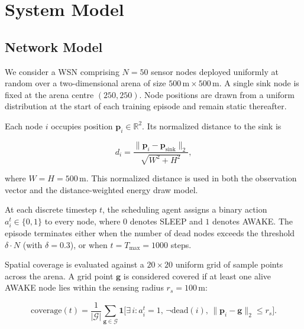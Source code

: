 \documentclass[journal]{IEEEtran}
\begin{document}
\section{System Model}
\label{sec:system}

\subsection{Network Model}
\label{sec:network_model}

We consider a WSN comprising $N = 50$ sensor nodes deployed uniformly
at random over a two-dimensional arena of size
$500\,\text{m} \times 500\,\text{m}$. A single sink node is fixed at
the arena centre $(250, 250)$. Node positions are drawn from a uniform
distribution at the start of each training episode and remain static
thereafter.

Each node $i$ occupies position $\mathbf{p}_i \in \mathbb{R}^2$. Its
normalized distance to the sink is

\begin{equation}
  d_i = \frac{\|\mathbf{p}_i - \mathbf{p}_{\text{sink}}\|_2}
             {\sqrt{W^2 + H^2}},
  \label{eq:dist}
\end{equation}

where $W = H = 500\,\text{m}$. This normalized distance is used in
both the observation vector and the distance-weighted energy draw
model.

At each discrete timestep $t$, the scheduling agent assigns a binary
action $a_i^t \in \{0, 1\}$ to every node, where $0$ denotes SLEEP and
$1$ denotes AWAKE. The episode terminates either when the number of dead
nodes exceeds the threshold $\delta \cdot N$ (with $\delta = 0.3$), or when
$t = T_{\max} = 1000$ steps.

Spatial coverage is evaluated against a $20 \times 20$ uniform grid of
sample points across the arena. A grid point $\mathbf{g}$ is considered
covered if at least one alive AWAKE node lies within the sensing radius
$r_s = 100\,\text{m}$:

\begin{equation}
  \text{coverage}(t) = \frac{1}{|\mathcal{G}|}
  \sum_{\mathbf{g} \in \mathcal{G}}
  \mathbf{1}\!\Big[\exists\, i :
  a_i^t {=} 1,\,
  \neg\text{dead}(i),\,
  \|\mathbf{p}_i {-} \mathbf{g}\|_2 {\leq} r_s \Big].
  \label{eq:coverage}
\end{equation}
\end{document}
